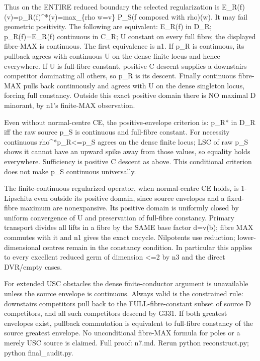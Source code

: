 \documentclass[11pt]{article}
\begin{document}
Thus on the ENTIRE reduced boundary the selected regularization is
 E\_R(f)(v)=p\_R(f)\textasciicircum{}*(v)=max\_\{rho w=v\} P\_S(f composed with rho)(w).
It may fail geometric positivity. The following are equivalent: E\_R(f) in D\_R; p\_R(f)=E\_R(f) continuous in C\_R; U constant on every full fibre; the displayed fibre-MAX is continuous. The first equivalence is n1. If p\_R is continuous, its pullback agrees with continuous U on the dense finite locus and hence everywhere. If U is full-fibre constant, positive C descent supplies a downstairs competitor dominating all others, so p\_R is its descent. Finally continuous fibre-MAX pulls back continuously and agrees with U on the dense singleton locus, forcing full constancy. Outside this exact positive domain there is NO maximal D minorant, by n1's finite-MAX observation.

Even without normal-centre CE, the positive-envelope criterion is: p\_R* in D\_R iff the raw source p\_S is continuous and full-fibre constant. For necessity continuous rho\textasciicircum{}*p\_R<=p\_S agrees on the dense finite locus; LSC of raw p\_S shows it cannot have an upward spike away from those values, so equality holds everywhere. Sufficiency is positive C descent as above. This conditional criterion does not make p\_S continuous universally.

The finite-continuous regularized operator, when normal-centre CE holds, is 1-Lipschitz even outside its positive domain, since source envelopes and a fixed-fibre maximum are nonexpansive. Its positive domain is uniformly closed by uniform convergence of U and preservation of full-fibre constancy. Primary transport divides all lifts in a fibre by the SAME base factor d=v(b); fibre MAX commutes with it and n1 gives the exact cocycle. Nilpotents use reduction; lower-dimensional centres remain in the constancy condition. In particular this applies to every excellent reduced germ of dimension <=2 by n3 and the direct DVR/empty cases.

For extended USC obstacles the dense finite-conductor argument is unavailable unless the source envelope is continuous. Always valid is the constrained rule: downstairs competitors pull back to the FULL-fibre-constant subset of source D competitors, and all such competitors descend by G331. If both greatest envelopes exist, pullback commutation is equivalent to full-fibre constancy of the source greatest envelope. No unconditional fibre-MAX formula for poles or a merely USC source is claimed. Full proof: n7.md. Rerun python reconstruct.py; python final\_audit.py.
\end{document}
